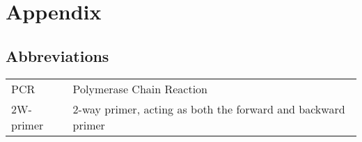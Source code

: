 

\newpage
\section{Appendix}
\subsection{Abbreviations}
		\begin{tabular}[H]{l l}
			PCR 		& 	Polymerase Chain Reaction \\
			2W-primer 	& 	2-way primer, acting as both the forward and backward primer
		\end{tabular}


